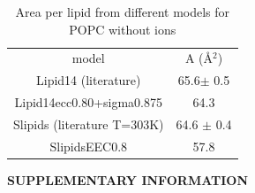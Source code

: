 \documentclass[aip,jcp]{revtex4}
\begin{document}
\begin{table}
  \caption{Area per lipid from different models for POPC without ions\label{apls} }
  \begin{tabular}{c c}
    model          & A (Å$^2$)    \\
    Lipid14 (literature)  & 65.6$\pm$ 0.5   \\
    Lipid14ecc0.80+sigma0.875 & 64.3      \\
    Slipids (literature T=303K)       & 64.6 $\pm$ 0.4   \\
    SlipidsEEC0.8  & 57.8  \\
  \end{tabular}
\end{table}



%

\begin{acknowledgments}
\end{acknowledgments}
\newpage
\appendix
\begin{center}
{\bf SUPPLEMENTARY INFORMATION}
\end{center}





\listoftodos
\end{document}
